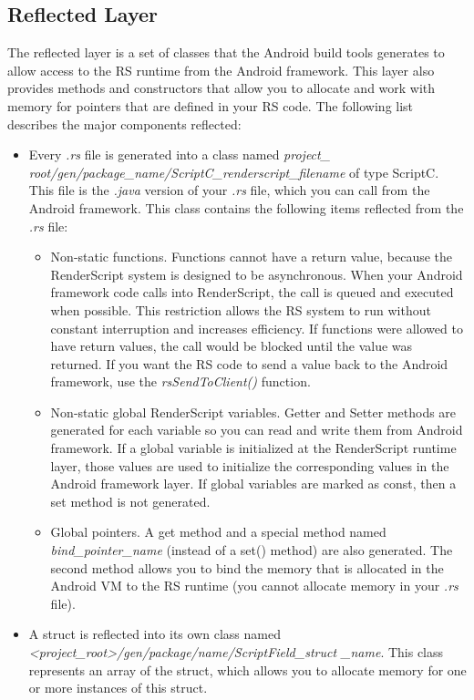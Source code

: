 \documentclass[a4paper,10pt]{article}
\begin{document}
\begin{multicols}{2}
\subsection{Reflected Layer}
The reflected layer is a set of classes that the Android build tools generates to allow access to the RS runtime from the Android framework. This layer also provides methods and constructors that allow you to allocate and work with memory for pointers that are defined in your RS code. The following list describes the major components reflected:
\begin{itemize}
\item Every \emph{.rs} file is generated into a class named \emph{project\_ root/gen/package\_name/ScriptC\_renderscript\_filename} of type ScriptC. This file is the \emph{.java} version of your \emph{.rs} file, which you can call from the Android framework. This class contains the following items reflected from the \emph{.rs} file:
\begin{itemize}
\item Non-static functions. Functions cannot have a return value, because the RenderScript system is designed to be asynchronous. When your Android framework code calls into RenderScript, the call is queued and executed when possible. This restriction allows the RS system to run without constant interruption and increases efficiency. If functions were allowed to have return values, the call would be blocked until the value was returned.
If you want the RS code to send a value back to the Android framework, use the \emph{rsSendToClient()} function. 
\item Non-static global RenderScript variables. Getter and Setter methods are generated for each variable so you can read and write them from Android framework. If a global variable is initialized at the RenderScript runtime layer, those values are used to initialize the corresponding values in the Android framework layer. If global variables are marked as const, then a set method is not generated.
\item Global pointers. A get method and a special method named \emph{bind\_pointer\_name} (instead of a set() method) are also generated. The second method allows you to bind the memory that is allocated in the Android VM to the RS runtime (you cannot allocate memory in your \emph{.rs} file).
\end{itemize}
\item A struct is reflected into its own class named \emph{<project\_root>/gen/package/name/ScriptField\_struct \_name}. This class represents an array of the struct, which allows you to allocate memory for one or more instances of this struct.
\end{itemize}


\end{multicols}
\end{document}
